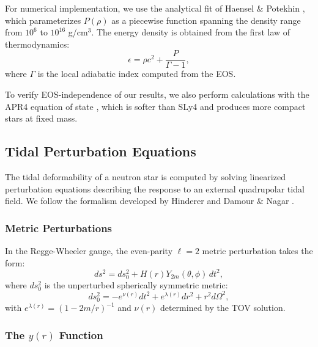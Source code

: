 \documentclass[twocolumn,showpacs,preprintnumbers,amsmath,amssymb,prd]{revtex4-2}
\begin{document}
For numerical implementation, we use the analytical fit of Haensel \& Potekhin \cite{Haensel2004}, which parameterizes $P(\rho)$ as a piecewise function spanning the density range from $10^6$ to $10^{16}$ g/cm$^3$. The energy density is obtained from the first law of thermodynamics:
\begin{equation}
\epsilon = \rho c^2 + \frac{P}{\Gamma - 1},
\end{equation}
where $\Gamma$ is the local adiabatic index computed from the EOS.

To verify EOS-independence of our results, we also perform calculations with the APR4 equation of state \cite{Akmal1998}, which is softer than SLy4 and produces more compact stars at fixed mass.

\subsection{Tidal Perturbation Equations}
\label{sec:methods_tidal}

The tidal deformability of a neutron star is computed by solving linearized perturbation equations describing the response to an external quadrupolar tidal field. We follow the formalism developed by Hinderer \cite{Hinderer2008} and Damour \& Nagar \cite{Damour2009}.

\subsubsection{Metric Perturbations}

In the Regge-Wheeler gauge, the even-parity $\ell = 2$ metric perturbation takes the form:
\begin{equation}
ds^2 = ds^2_0 + H(r) Y_{2m}(\theta,\phi) \, dt^2,
\end{equation}
where $ds^2_0$ is the unperturbed spherically symmetric metric:
\begin{equation}
ds^2_0 = -e^{\nu(r)} dt^2 + e^{\lambda(r)} dr^2 + r^2 d\Omega^2,
\end{equation}
with $e^{\lambda(r)} = (1 - 2m/r)^{-1}$ and $\nu(r)$ determined by the TOV solution.

\subsubsection{The $y(r)$ Function}
\end{document}
